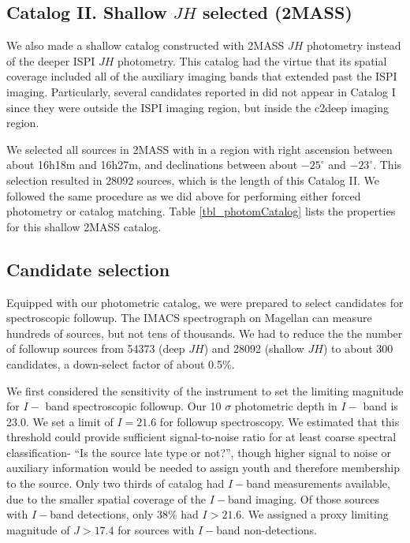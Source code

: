 \subsection{Catalog II. Shallow $JH$ selected (2MASS)}
We also made a shallow catalog constructed with 2MASS $JH$ photometry instead of the deeper ISPI $JH$ photometry.  This catalog had the virtue that its spatial coverage included all of the auxiliary imaging bands that extended past the ISPI imaging.  Particularly, several candidates reported in \citet{2010ApJ...720.1374H} did not appear in Catalog I since they were outside the ISPI imaging region, but inside the c2deep imaging region.

We selected all sources in 2MASS with in a region with right ascension between about 16h18m and 16h27m, and declinations between about $-25^{\circ}$ and $-23^{\circ}$.  This selection resulted in 28092 sources, which is the length of this Catalog II.  We followed the same procedure as we did above for performing either forced photometry or catalog matching.  Table \ref{tbl_photomCatalog} lists the properties for this shallow 2MASS catalog.


\subsection{Candidate selection}


Equipped with our photometric catalog, we were prepared to select candidates for spectroscopic followup.  The IMACS spectrograph on Magellan can measure hundreds of sources, but not tens of thousands.  We had to reduce the the number of followup sources from 54373 (deep $JH$) and 28092 (shallow $JH$) to about 300 candidates, a down-select factor of about 0.5\%.  

We first considered the sensitivity of the instrument to set the limiting magnitude for $I-$ band spectroscopic followup.  Our 10 $\sigma$ photometric depth in $I-$ band is 23.0.  We set a limit of $I=21.6$ for followup spectroscopy.  We estimated that this threshold could provide sufficient signal-to-noise ratio for at least coarse spectral classification- ``Is the source late type or not?'', though higher signal to noise or auxiliary information would be needed to assign youth and therefore membership to the source.  Only two thirds of catalog had $I-$band measurements available, due to the smaller spatial coverage of the $I-$band imaging.  Of those sources with $I-$band detections, only 38\% had $I>21.6$.  We assigned a proxy limiting magnitude of $J>17.4$ for sources with $I-$band non-detections.


